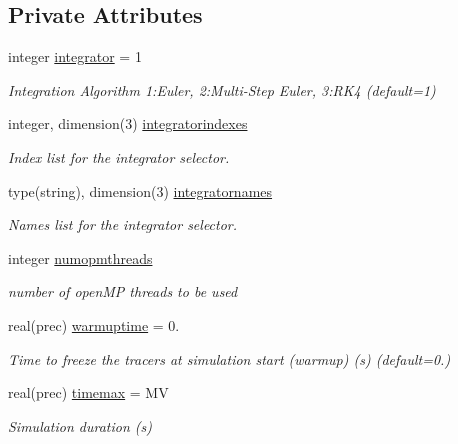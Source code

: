 \subsection*{Private Attributes}
\begin{DoxyCompactItemize}
\item 
integer \mbox{\hyperlink{structsimulationglobals__mod_1_1parameters__t_a1489379b1bb839280c0715470250c9f5}{integrator}} = 1
\begin{DoxyCompactList}\small\item\em Integration Algorithm 1\+:Euler, 2\+:Multi-\/\+Step Euler, 3\+:R\+K4 (default=1) \end{DoxyCompactList}\item 
integer, dimension(3) \mbox{\hyperlink{structsimulationglobals__mod_1_1parameters__t_adf4a0c840f5b357417f8c729f33c6428}{integratorindexes}}
\begin{DoxyCompactList}\small\item\em Index list for the integrator selector. \end{DoxyCompactList}\item 
type(string), dimension(3) \mbox{\hyperlink{structsimulationglobals__mod_1_1parameters__t_aede2d1d4d08c9f3d8b4b4f68029eed65}{integratornames}}
\begin{DoxyCompactList}\small\item\em Names list for the integrator selector. \end{DoxyCompactList}\item 
integer \mbox{\hyperlink{structsimulationglobals__mod_1_1parameters__t_a5223907bf0b209d2c3c4e6f034051915}{numopmthreads}}
\begin{DoxyCompactList}\small\item\em number of open\+MP threads to be used \end{DoxyCompactList}\item 
real(prec) \mbox{\hyperlink{structsimulationglobals__mod_1_1parameters__t_acab4746165c72ab2947c178c95c1c577}{warmuptime}} = 0.
\begin{DoxyCompactList}\small\item\em Time to freeze the tracers at simulation start (warmup) (s) (default=0.) \end{DoxyCompactList}\item 
real(prec) \mbox{\hyperlink{structsimulationglobals__mod_1_1parameters__t_a196b29045b2a76de4a1a0efd8c587838}{timemax}} = MV
\begin{DoxyCompactList}\small\item\em Simulation duration (s) \end{DoxyCompactList}\item 

\end{DoxyCompactItemize}
